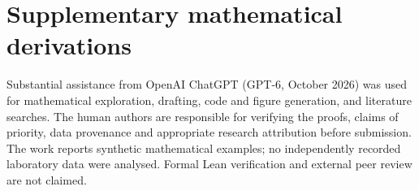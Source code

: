 \documentclass[aps,prd,onecolumn,notitlepage,11pt,superscriptaddress,longbibliography]{revtex4-2}
\begin{document}
\clearpage
\appendix
\section*{Supplementary mathematical derivations}



\clearpage



\setcounter{section}{0}




\begin{acknowledgments}
Substantial assistance from OpenAI ChatGPT (GPT-6, October 2026) was used
for mathematical exploration, drafting, code and figure generation,
and literature searches. The human authors are responsible for verifying
the proofs, claims of priority, data provenance and appropriate
research attribution before submission. The work reports synthetic
mathematical examples; no independently recorded laboratory data were
analysed. Formal Lean verification and external peer review are
not claimed.
\end{acknowledgments}
\end{document}
